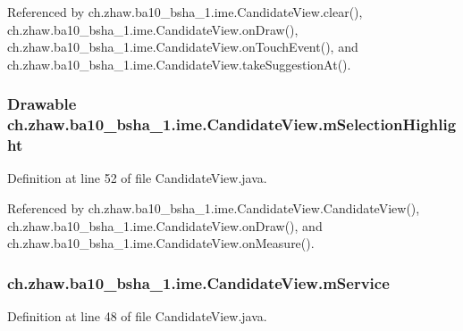 Referenced by ch.zhaw.ba10\_\-bsha\_\-1.ime.CandidateView.clear(), ch.zhaw.ba10\_\-bsha\_\-1.ime.CandidateView.onDraw(), ch.zhaw.ba10\_\-bsha\_\-1.ime.CandidateView.onTouchEvent(), and ch.zhaw.ba10\_\-bsha\_\-1.ime.CandidateView.takeSuggestionAt().\hypertarget{classch_1_1zhaw_1_1ba10__bsha__1_1_1ime_1_1CandidateView_a4242253fd23317c3e023553f91199268}{
\subsubsection[{mSelectionHighlight}]{\setlength{\rightskip}{0pt plus 5cm}Drawable {\bf ch.zhaw.ba10\_\-bsha\_\-1.ime.CandidateView.mSelectionHighlight}}}
\label{classch_1_1zhaw_1_1ba10__bsha__1_1_1ime_1_1CandidateView_a4242253fd23317c3e023553f91199268}


Definition at line 52 of file CandidateView.java.

Referenced by ch.zhaw.ba10\_\-bsha\_\-1.ime.CandidateView.CandidateView(), ch.zhaw.ba10\_\-bsha\_\-1.ime.CandidateView.onDraw(), and ch.zhaw.ba10\_\-bsha\_\-1.ime.CandidateView.onMeasure().\hypertarget{classch_1_1zhaw_1_1ba10__bsha__1_1_1ime_1_1CandidateView_a0d884c9d53fd9e83c4f07227d64d0e4a}{
\subsubsection[{mService}]{ {\bf ch.zhaw.ba10\_\-bsha\_\-1.ime.CandidateView.mService}}}
\label{classch_1_1zhaw_1_1ba10__bsha__1_1_1ime_1_1CandidateView_a0d884c9d53fd9e83c4f07227d64d0e4a}


Definition at line 48 of file CandidateView.java.

